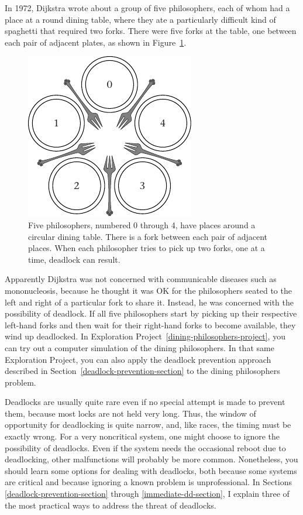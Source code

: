 In 1972, Dijkstra wrote about a group of five philosophers, each of
whom had a place at a round dining table, where they ate a
particularly difficult kind of spaghetti that required two forks.
There were five forks at the table, one between each pair of
adjacent plates, as shown in Figure~\ref{dining-figure}.
\begin{figure}
\centerline{\includegraphics{hail_f0420}}
\caption{Five philosophers, numbered 0 through 4, have places around a
  circular dining table.  There is a fork between each pair of
  adjacent places.  When each philosopher tries to pick up two forks,
  one at a time,
  deadlock can result.}
\label{dining-figure}
\end{figure}
Apparently
Dijkstra was not concerned with communicable diseases such as
mononucleosis, because he thought it was OK for the philosophers
seated to the left and right of a particular fork to share it.
Instead, he was concerned with the possibility of deadlock.  If all five philosophers start by
picking up their respective left-hand forks and then wait for their right-hand forks to become available, they wind up deadlocked.
In
Exploration Project~\ref{dining-philosophers-project}, you can try out
a computer simulation of the dining philosophers.  In that same Exploration
Project, you can also apply the deadlock prevention approach described
in Section~\ref{deadlock-prevention-section} to the dining
philosophers problem.

Deadlocks are usually quite rare even if no special attempt is made
to prevent them, because most locks are not held very long.  Thus,
the window of opportunity for deadlocking is quite narrow, and, like
races, the timing must be exactly wrong.  For a very noncritical system,
one might choose to ignore the possibility of deadlocks.  Even if the
system needs the occasional reboot due to deadlocking, other
malfunctions will probably be more common.  Nonetheless, you should
learn some options for dealing with deadlocks, both because some
systems are critical and because ignoring a known problem is
unprofessional.  In Sections \ref{deadlock-prevention-section} through
\ref{immediate-dd-section}, I explain three of the
most practical ways to address the threat of deadlocks.

